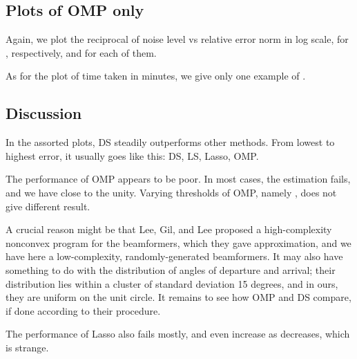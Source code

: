 \subsection {Plots of OMP only}

Again, we plot the reciprocal of noise level vs relative error norm in log scale, for , respectively, and  for each of them.

%
\blank [big]
\blank [big]
%
\blank [big]
\blank [big]
%
\blank [big]
\blank [big]
%
As for the plot of time taken in minutes, we give only one example of .
%
\blank [big]
\blank [big]



\subsection {Discussion}

In the assorted plots, DS steadily outperforms other methods.
From lowest to highest error, it usually goes like this: DS, LS, Lasso, OMP.

The performance of OMP appears to be poor.
In most cases, the estimation fails, and we have \m {\tilde {\chi}} close to the unity.
Varying thresholds of OMP, namely , does not give different result.

A crucial reason might be that Lee, Gil, and Lee \cite {LGL16} proposed a high-complexity nonconvex program for the beamformers, which they gave approximation, and we have here a low-complexity, randomly-generated beamformers.
It may also have something to do with the distribution of angles of departure and arrival;
their distribution lies within a cluster of standard deviation 15 degrees, and in ours, they are uniform on the unit circle.
It remains to see how OMP and DS compare, if done according to their procedure.

The performance of Lasso also fails mostly, and \m {\tilde {\chi}} even increase as \m {\s} decreases, which is strange.

